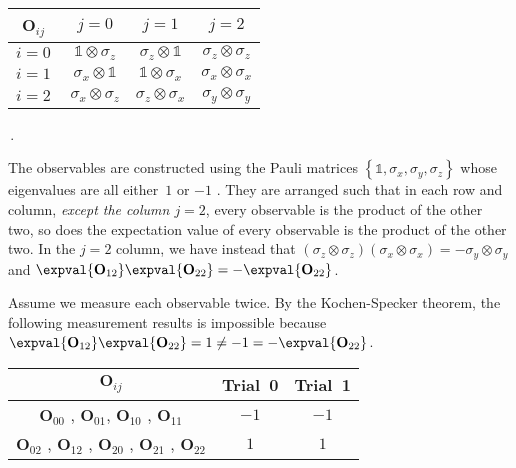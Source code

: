 \documentclass[english,reprint, aps, prl,superscriptaddress, showpacs,
showkeys, longbibliography, amsmath, amssymb, floatfix]{revtex4-1}
\theoremstyle{plain}
\theoremstyle{definition}
\begin{document}
{{\renewcommand{\arraystretch}{2}%
\begin{center} 
\begin{tabular}{r|@{\quad}c@{\quad}|@{\quad}c@{\quad}|@{\quad}c@{\quad}|} 
$\mathbf{O}_{ij}$~ & $j=0$ & $j=1$ & $j=2$ \\ 
\hline  
$i=0~$ & $\mathbb{1}\otimes\sigma_{z}$  & $\sigma_{z}\otimes\mathbb{1}$  & $\sigma_{z}\otimes\sigma_{z}$ \tabularnewline 
\hline  
$i=1~$ & $\sigma_{x}\otimes\mathbb{1}$  & $\mathbb{1}\otimes\sigma_{x}$  & $\sigma_{x}\otimes\sigma_{x}$ \tabularnewline 
\hline  
$i=2~$ & $\sigma_{x}\otimes\sigma_{z}$  & $\sigma_{z}\otimes\sigma_{x}$  & $\sigma_{y}\otimes\sigma_{y}$ \tabularnewline 
\hline  
\end{tabular}\,.
\par\end{center} 
}

\noindent The observables are constructed using the Pauli matrices
$\left\{ \mathbb{1},\sigma_{x},\sigma_{y},\sigma_{z}\right\} $ whose
eigenvalues are all either~$1$ or $-1$ \cite{Redhead1987-REDINA,544199,Griffiths2003,Jaeger2007,Mermin2007}.
They are arranged such that in each row and column, \emph{except the
column $j=2$}, every observable is the product of the other two,
so does the expectation value of every observable is the product of
the other two. In the $j=2$ column, we have instead that $\left(\sigma_{z}\otimes\sigma_{z}\right)\left(\sigma_{x}\otimes\sigma_{x}\right)=-\sigma_{y}\otimes\sigma_{y}$
and $\expval{\mathbf{O}_{12}}\expval{\mathbf{O}_{22}}=-\expval{\mathbf{O}_{22}}$.

Assume we measure each observable twice. By the Kochen-Specker theorem,
the following measurement results is impossible because $\expval{\mathbf{O}_{12}}\expval{\mathbf{O}_{22}}=1\ne-1=-\expval{\mathbf{O}_{22}}$.
\begin{center}
\begin{tabular}{ccc}
\toprule 
\addlinespace
$\mathbf{O}_{ij}$  & Trial~0 & Trial~1\tabularnewline
\midrule
\midrule 
\addlinespace
$\mathbf{O}_{00}$ , $\mathbf{O}_{01}$, $\mathbf{O}_{10}$ , $\mathbf{O}_{11}$  & $-1$ & $-1$\tabularnewline
\midrule 
\addlinespace
$\mathbf{O}_{02}$ , $\mathbf{O}_{12}$ , $\mathbf{O}_{20}$ , $\mathbf{O}_{21}$
, $\mathbf{O}_{22}$  & $1$ & $1$\tabularnewline
\bottomrule
\end{tabular}
\par\end{center}

}
\end{document}
